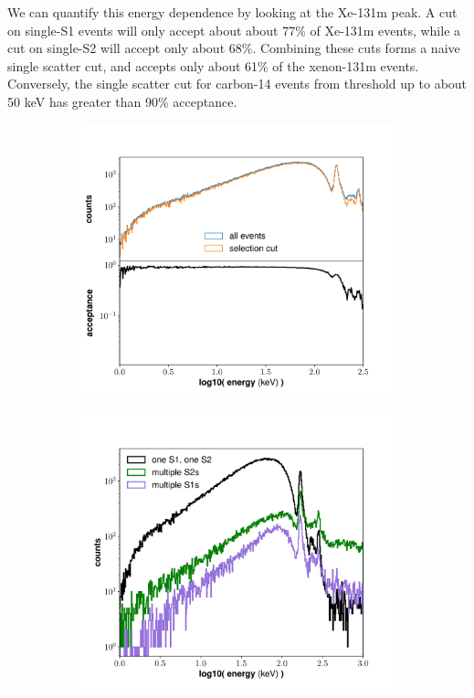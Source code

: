 We can quantify this energy dependence by looking at the Xe-131m peak. A cut on single-S1 events will only accept about about 77\% of Xe-131m events, while a cut on single-S2 will accept only about 68\%. Combining these cuts forms a naive single scatter cut, and accepts only about 61\% of the xenon-131m events. Conversely, the single scatter cut for carbon-14 events from threshold up to about 50 keV has greater than 90\% acceptance.
\begin{figure}[h!]
\centering
\begin{subfigure}{0.5\textwidth}
  \centering
  \includegraphics[width=\textwidth]{Figures/DataSelection_singlescatter}
\end{subfigure}%
\begin{subfigure}{0.5\textwidth}
  \centering
  \includegraphics[width=\textwidth]{Figures/DataSelection_multiS1S2}

\end{subfigure}
\end{figure}
